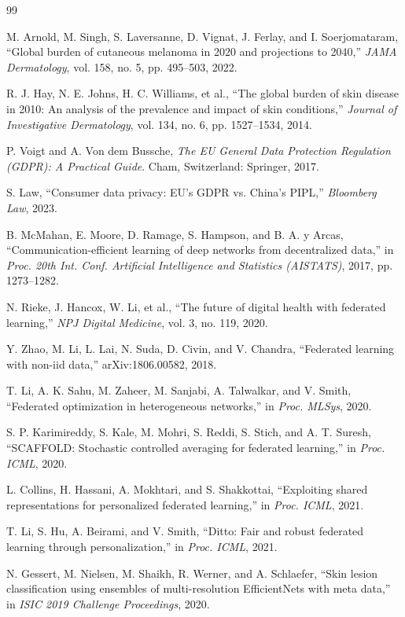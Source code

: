 \documentclass{ieeeaccess}
\begin{document}
\begin{thebibliography}{99}

M. Arnold, M. Singh, S. Laversanne, D. Vignat, J. Ferlay, and I. Soerjomataram,
“Global burden of cutaneous melanoma in 2020 and projections to 2040,”
\emph{JAMA Dermatology}, vol. 158, no. 5, pp. 495–503, 2022.

R. J. Hay, N. E. Johns, H. C. Williams, et al.,
“The global burden of skin disease in 2010: An analysis of the prevalence and impact of skin conditions,”
\emph{Journal of Investigative Dermatology}, vol. 134, no. 6, pp. 1527–1534, 2014.

P. Voigt and A. Von dem Bussche,
\emph{The EU General Data Protection Regulation (GDPR): A Practical Guide}.
Cham, Switzerland: Springer, 2017.

S. Law,
“Consumer data privacy: EU’s GDPR vs. China’s PIPL,”
\emph{Bloomberg Law}, 2023.

B. McMahan, E. Moore, D. Ramage, S. Hampson, and B. A. y Arcas,
“Communication-efficient learning of deep networks from decentralized data,”
in \emph{Proc. 20th Int. Conf. Artificial Intelligence and Statistics (AISTATS)}, 2017, pp. 1273–1282.

N. Rieke, J. Hancox, W. Li, et al.,
“The future of digital health with federated learning,”
\emph{NPJ Digital Medicine}, vol. 3, no. 119, 2020.

Y. Zhao, M. Li, L. Lai, N. Suda, D. Civin, and V. Chandra,
“Federated learning with non-iid data,”
arXiv:1806.00582, 2018.

T. Li, A. K. Sahu, M. Zaheer, M. Sanjabi, A. Talwalkar, and V. Smith,
“Federated optimization in heterogeneous networks,”
in \emph{Proc. MLSys}, 2020.

S. P. Karimireddy, S. Kale, M. Mohri, S. Reddi, S. Stich, and A. T. Suresh,
“SCAFFOLD: Stochastic controlled averaging for federated learning,”
in \emph{Proc. ICML}, 2020.

L. Collins, H. Hassani, A. Mokhtari, and S. Shakkottai,
“Exploiting shared representations for personalized federated learning,”
in \emph{Proc. ICML}, 2021.

T. Li, S. Hu, A. Beirami, and V. Smith,
“Ditto: Fair and robust federated learning through personalization,”
in \emph{Proc. ICML}, 2021.

N. Gessert, M. Nielsen, M. Shaikh, R. Werner, and A. Schlaefer,
“Skin lesion classification using ensembles of multi-resolution EfficientNets with meta data,”
in \emph{ISIC 2019 Challenge Proceedings}, 2020.


\end{thebibliography}
\end{document}
